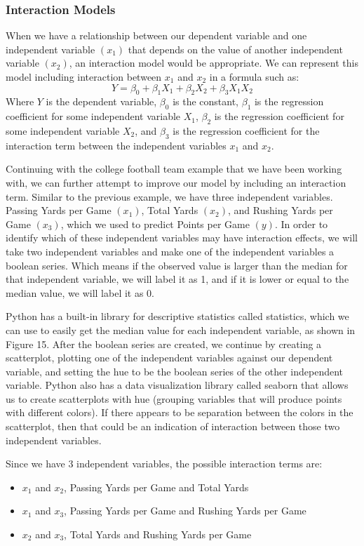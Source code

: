 \documentclass[a4paper,12pt]{report}
\begin{document}
\subsubsection{Interaction Models}
When we have a relationship between our dependent variable  and one independent variable $(x_1)$ that depends on the value of another independent variable $(x_2)$, an interaction model would be appropriate. We can represent this model including interaction between $x_1$ and $x_2$ in a formula such as:
$$Y=\beta_0+\beta_1X_1+\beta_2X_2+\beta_3X_1X_2$$
Where $Y$ is the dependent variable, $\beta_0$ is the constant, $\beta_1$ is the regression coefficient for some independent variable $X_1$, $\beta_2$ is the regression coefficient for some independent variable $X_2$, and $\beta_3$ is the regression coefficient for the interaction term between the independent variables $x_1$ and $x_2$.

Continuing with the college football team example that we have been working with, we can further attempt to improve our model by including an interaction term. Similar to the previous example, we have three independent variables. Passing Yards per Game $(x_1)$, Total Yards $(x_2)$, and Rushing Yards per Game $(x_3)$, which we used to predict Points per Game $(y)$. In order to identify which of these independent variables may have interaction effects, we will take two independent variables and make one of the independent variables a boolean series. Which means if the observed value is larger than the median for that independent variable, we will label it as 1, and if it is lower or equal to the median value, we will label it as 0.

Python has a built-in library for descriptive statistics called statistics, which we can use to easily get the median value for each independent variable, as shown in Figure 15. After the boolean series are created, we continue by creating a scatterplot, plotting one of the independent variables against our dependent variable, and setting the hue to be the boolean series of the other independent variable. Python also has a data visualization library called seaborn that allows us to create scatterplots with hue (grouping variables that will produce points with different colors). If there appears to be separation between the colors in the scatterplot, then that could be an indication of interaction between those two independent variables. 

Since we have 3 independent variables, the possible interaction terms are:
\begin{itemize}[,]
    \setlength\itemsep{-.1cm}
    \item $x_1$ and $x_2$, Passing Yards per Game and Total Yards
    \item $x_1$ and $x_3$, Passing Yards per Game and Rushing Yards per Game
    \item $x_2$ and $x_3$, Total Yards and Rushing Yards per Game
\end{itemize}
\end{document}
